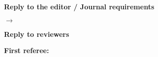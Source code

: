 \documentclass[10pt,a4paper,sans]{moderncv}        %
\begin{document}
\textbf{Reply to the editor / Journal requirements}

\textit{}

\medskip

$\rightarrow$ 


\bigskip

\textbf{Reply to reviewers}


\medskip


\textbf{First referee:}

\medskip



\end{document}
